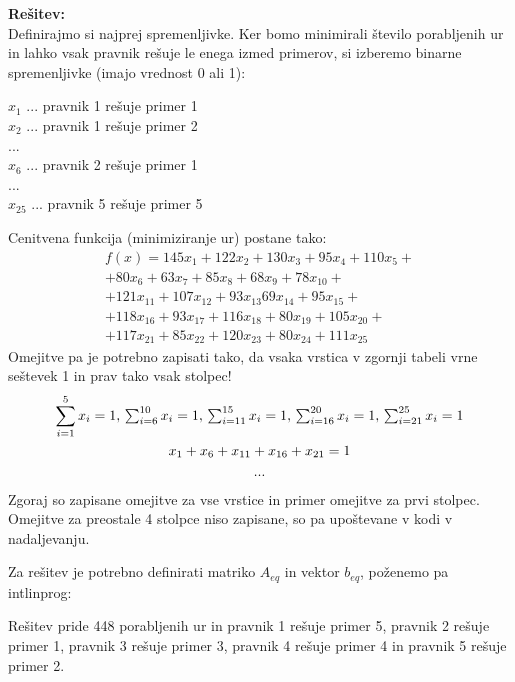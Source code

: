 \documentclass[a4paper,11pt]{article}
\begin{document}
\vspace{5mm} \noindent \textbf{Rešitev:} \\
Definirajmo si najprej spremenljivke. Ker bomo minimirali število porabljenih ur in lahko vsak pravnik rešuje le enega izmed primerov, si izberemo binarne spremenljivke (imajo vrednost 0 ali 1): 
\begin{center}
$x_1$ ... pravnik 1 rešuje primer 1 \\
$x_2$ ... pravnik 1 rešuje primer 2 \\
... \\
$x_6$ ... pravnik 2 rešuje primer 1 \\
... \\
$x_{25}$ ... pravnik 5 rešuje primer 5 \\
\end{center}
Cenitvena funkcija (minimiziranje ur) postane tako:
\begin{multline}
f(x) = 145x_1 + 122x_2 + 130x_3 + 95x_4 + 110x_5 + \\
+  80x_6 + 63x_7 + 85x_8 + 68x_9 + 78x_{10} +\\
+  121x_{11} + 107x_{12} + 93x_{13} 69x_{14} + 95x_{15} + \\
+ 118x_{16} + 93x_{17} + 116x_{18} + 80x_{19} + 105x_{20} + \\
+ 117x_{21} + 85x_{22} + 120x_{23} + 80x_{24} + 111x_{25} 
\end{multline}
Omejitve pa je potrebno zapisati tako, da vsaka vrstica v zgornji tabeli vrne seštevek 1 in prav tako vsak stolpec!
\begin{equation*}
\begin{gathered}
\sum_{i=1}^5 x_i = 1 $,   $ \sum_{i=6}^{10} x_i = 1 $,   $ \sum_{i=11}^{15} x_i = 1 $,   $ \sum_{i=16}^{20} x_i = 1 $,   $ \sum_{i=21}^{25} x_i = 1 \\
x_1 + x_6 + x_{11} + x_{16} + x_{21} = 1 \\
...
\end{gathered}
\end{equation*}
Zgoraj so zapisane omejitve za vse vrstice in primer omejitve za prvi stolpec. Omejitve za preostale 4 stolpce niso zapisane, so pa upoštevane v kodi v nadaljevanju.

Za rešitev je potrebno definirati matriko $A_{eq}$ in vektor $b_{eq}$, poženemo pa intlinprog: 

Rešitev pride 448 porabljenih ur in pravnik 1 rešuje primer 5, pravnik 2 rešuje primer 1, pravnik 3 rešuje primer 3, pravnik 4 rešuje primer 4 in pravnik 5 rešuje primer 2.
\end{document}
